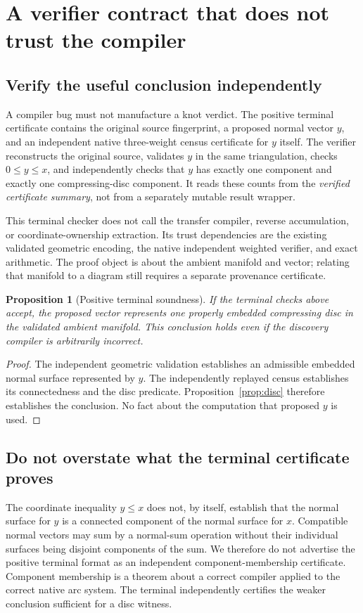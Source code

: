 \documentclass[11pt]{article}
\newtheorem{proposition}[theorem]{Proposition}
\theoremstyle{definition}\newtheorem{definition}[theorem]{Definition}
\theoremstyle{remark}\newtheorem{remark}[theorem]{Remark}
\begin{document}
\section{A verifier contract that does not trust the compiler}
\label{sec:certificate}

\subsection{Verify the useful conclusion independently}
A compiler bug must not manufacture a knot verdict. The positive terminal
certificate contains the original source fingerprint, a proposed normal vector
$y$, and an independent native three-weight census certificate for $y$ itself.
The verifier reconstructs the original source, validates $y$ in the same
triangulation, checks $0\le y\le x$, and independently checks that $y$ has exactly
one component and exactly one compressing-disc component. It reads these counts
from the \emph{verified certificate summary}, not from a separately mutable
result wrapper.

This terminal checker does not call the transfer compiler, reverse accumulation,
or coordinate-ownership extraction. Its trust dependencies are the existing
validated geometric encoding, the native independent weighted verifier, and
exact arithmetic. The proof object is about the ambient manifold and vector;
relating that manifold to a diagram still requires a separate provenance
certificate.

\begin{proposition}[Positive terminal soundness]
If the terminal checks above accept, the proposed vector represents one properly
embedded compressing disc in the validated ambient manifold. This conclusion
holds even if the discovery compiler is arbitrarily incorrect.
\end{proposition}
\begin{proof}
The independent geometric validation establishes an admissible embedded normal
surface represented by $y$. The independently replayed census establishes its
connectedness and the disc predicate. Proposition~\ref{prop:disc} therefore
establishes the conclusion. No fact about the computation that proposed $y$ is
used.
\end{proof}

\subsection{Do not overstate what the terminal certificate proves}
The coordinate inequality $y\le x$ does not, by itself, establish that the normal
surface for $y$ is a connected component of the normal surface for $x$.
Compatible normal vectors may sum by a normal-sum operation without their
individual surfaces being disjoint components of the sum. We therefore do not
advertise the positive terminal format as an independent component-membership
certificate. Component membership is a theorem about a correct compiler applied
to the correct native arc system. The terminal independently certifies the
weaker conclusion sufficient for a disc witness.
\end{document}
